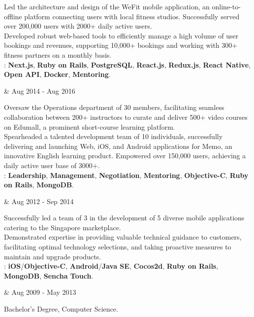 \tbullet Led the architecture and design of the WeFit mobile application, an online-to-offline platform connecting users with local fitness studios. Successfully served over 200,000 users with 2000+ daily active users. \\[1mm]
\tbullet Developed robust web-based tools to efficiently manage a high volume of user bookings and revenues, supporting 10,000+ bookings and working with 300+ fitness partners on a monthly basis. \\[3mm]
: \textbf{Next.js}, \textbf{Ruby on Rails}, \textbf{PostgreSQL}, \textbf{React.js}, \textbf{Redux.js}, \textbf{React Native}, \textbf{Open API}, \textbf{Docker}, \textbf{Mentoring}.

\vspace{7.5mm}

\begin{workexp}
   \at \href{https://topica.asia/}{}  &
  Aug 2014 - Aug 2016 
\end{workexp}

\tbullet Oversaw the Operations department of 30 members, facilitating seamless collaboration between 200+ instructors to curate and deliver 500+ video courses on Edumall, a prominent short-course learning platform. \\[1mm]
\tbullet Spearheaded a talented development team of 10 individuals, successfully delivering and launching Web, iOS, and Android applications for Memo, an innovative English learning product. Empowered over 150,000 users, achieving a daily active user base of 3000+. \\[3mm]
: \textbf{Leadership}, \textbf{Management}, \textbf{Negotiation}, \textbf{Mentoring}, \textbf{Objective-C}, \textbf{Ruby on Rails}, \textbf{MongoDB}.

\vspace{7.5mm}

\begin{workexp}
   \at \href{https://vinova.sg/}{}  &
  Aug 2012 - Sep 2014 
\end{workexp}

\tbullet Successfully led a team of 3 in the development of 5 diverse mobile applications catering to the Singapore marketplace. \\[1mm]
\tbullet Demonstrated expertise in providing valuable technical guidance to customers, facilitating optimal technology selections, and taking proactive measures to maintain and upgrade products. \\[3mm]
: \textbf{iOS}/\textbf{Objective-C}, \textbf{Android}/\textbf{Java SE}, \textbf{Cocos2d}, \textbf{Ruby on Rails}, \textbf{MongoDB}, \textbf{Sencha Touch}.

\vspace{7.5mm}

\begin{workexp}
   \at \href{https://e.uet.vnu.edu.vn}{} &
  Aug 2009 - May 2013 
\end{workexp}

\tbullet Bachelor's Degree, Computer Science.
